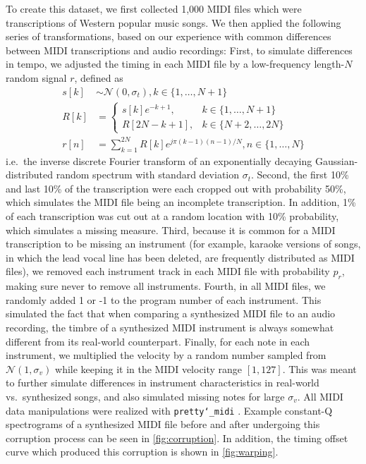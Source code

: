 To create this dataset, we first collected 1,000 MIDI files which were transcriptions of Western popular music songs.
We then applied the following series of transformations, based on our experience with common differences between MIDI transcriptions and audio recordings:
First, to simulate differences in tempo, we adjusted the timing in each MIDI file by a low-frequency length-$N$ random signal $r$, defined as
\begin{align}
s[k] &\sim \mathcal{N}(0, \sigma_t), k \in \{1, \ldots, N + 1\}\\
R[k] &= \begin{cases}
s[k]e^{-k + 1}, &k \in \{1, \ldots, N + 1\}\\
R[2N - k + 1], &k \in \{N + 2, \ldots, 2N \}
\end{cases}\\
r[n] &= \sum_{k = 1}^{2N} R[k]e^{j\pi (k - 1)(n - 1)/N}, n \in \{1, \ldots, N\}
\label{eq:offset_signal}
\end{align}
i.e.\ the inverse discrete Fourier transform of an exponentially decaying Gaussian-distributed random spectrum with standard deviation $\sigma_t$.
Second, the first 10\% and last 10\% of the transcription were each cropped out with probability 50\%, which simulates the MIDI file being an incomplete transcription.
In addition, 1\% of each transcription was cut out at a random location with 10\% probability, which simulates a missing measure.
Third, because it is common for a MIDI transcription to be missing an instrument (for example, karaoke versions of songs, in which the lead vocal line has been deleted, are frequently distributed as MIDI files), we removed each instrument track in each MIDI file with probability $p_r$, making sure never to remove all instruments.
Fourth, in all MIDI files, we randomly added 1 or -1 to the program number of each instrument.
This simulated the fact that when comparing a synthesized MIDI file to an audio recording, the timbre of a synthesized MIDI instrument is always somewhat different from its real-world counterpart.
Finally, for each note in each instrument, we multiplied the velocity by a random number sampled from $\mathcal{N}(1, \sigma_v)$ while keeping it in the MIDI velocity range $[1, 127]$.
This was meant to further simulate differences in instrument characteristics in real-world vs.\ synthesized songs, and also simulated missing notes for large $\sigma_v$.
All MIDI data manipulations were realized with \texttt{pretty\char`_midi} \cite{raffel2014pretty_midi}.
Example constant-Q spectrograms of a synthesized MIDI file before and after undergoing this corruption process can be seen in \cref{fig:corruption}.
In addition, the timing offset curve which produced this corruption is shown in \cref{fig:warping}.

